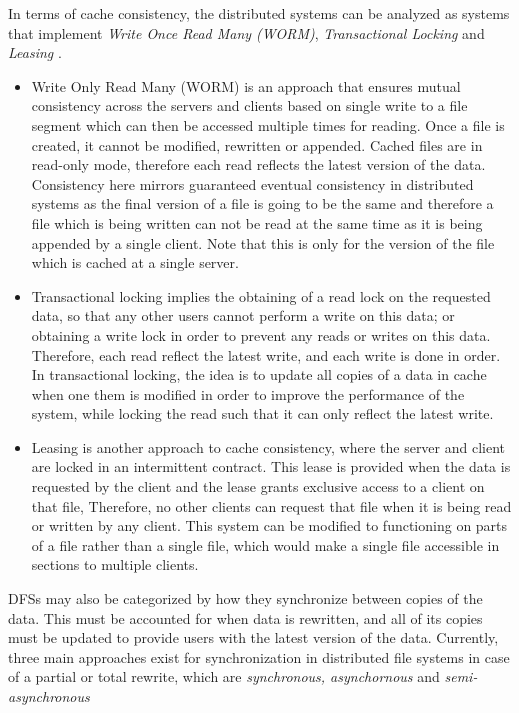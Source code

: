 \documentclass{article}
\begin{document}
In terms of cache consistency, the distributed systems can be analyzed as systems that implement \textit{Write Once Read Many (WORM)}, \textit{Transactional Locking} and \textit{Leasing} \cite{reed1996analysis}. 

\begin{itemize}
    \item Write Only Read Many (WORM) is an approach that ensures mutual consistency across the servers and clients based on single write to a file segment which can then be accessed multiple times for reading.  Once a file is created, it cannot be modified, rewritten or appended.  Cached files are in read-only mode, therefore each read reflects the latest version of the data. Consistency here mirrors guaranteed eventual consistency in distributed systems as the final version of a file is going to be the same and therefore a file which is being written can not be read at the same time as it is being appended by a single client. Note that this is only for the version of the file which is cached at a single server.
    
    \item Transactional locking implies the obtaining of a read lock on the requested data, so that any other users cannot perform a write on this data; or obtaining a write lock in order to prevent any reads or writes on this data. Therefore, each read reflect the latest write, and each write is done in order. In transactional locking, the idea is to update all copies of a data in cache when one them is modified in order to improve the performance of the system, while locking the read such that it can only reflect the latest write.
    
    \item Leasing is another approach to cache consistency, where the server and client are locked in an intermittent contract. This lease is provided when the data is requested by the client and the lease grants exclusive access to a client on that file, Therefore, no other clients can request that file when it is being read or written by any client. This system can be modified to functioning on parts of a file rather than a single file, which would make a single file accessible in sections to multiple clients.
\end{itemize}

DFSs may also be categorized by how they synchronize between copies of the data. This must be accounted for when data is rewritten, and all of its copies must be updated to provide users with the latest version of the data. Currently, three main approaches exist for synchronization in distributed file systems in case of a partial or total rewrite, which are \textit{synchronous, asynchornous} and \textit{semi-asynchronous}
\end{document}
